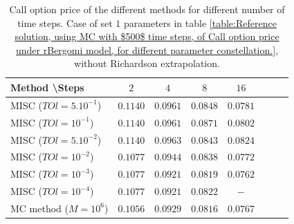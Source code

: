 \documentclass[11pt]{article}
\begin{document}
\begin{table}[h!]
	\centering
	\begin{tabular}{l*{6}{c}r}
		Method \textbackslash  Steps            & $2$ & $4$ & $8$ & $16$ &   \\
		\hline
		MISC ($TOl=5.10^{-1}$)  & $0.1140$ & $0.0961$ & $0.0848$ & $0.0781$  \\
		MISC ($TOl=10^{-1}$)  & $0.1140$ & $0.0961$ & $0.0871$ & $0.0802$  \\
		MISC ($TOl=5.10^{-2}$)  & $0.1140$ & $0.0963$ & $0.0843$ & $0.0824$  \\
		MISC ($TOl=10^{-2}$)  & $0.1077$ & $0.0944$ & $0.0838$ & $0.0772$  \\
		MISC ($TOl=10^{-3}$)  & $0.1077$ & $0.0921$ & $0.0819$ & $0.0762$  \\
		MISC ($TOl=10^{-4}$)  & $0.1077$ & $0.0921$ & $0.0822$ & $-$  \\
		\hline
		MC method ($M=10^{6}$)   & $  0.1056$ & $ 0.0929
		$  & $   0.0816
		$ & $ 0.0767$ \\		
		
		\hline
	\end{tabular}
	\caption{ Call option price of the different methods for different number of time steps. Case of set $1$ parameters in table \ref{table:Reference solution, using MC with $500$ time steps, of Call option price under rBergomi model, for different parameter constellation.}, without Richardson extrapolation.}
	\label{table: Call option price of the different methods for different number of time steps. Case set 1}
\end{table}
\end{document}
